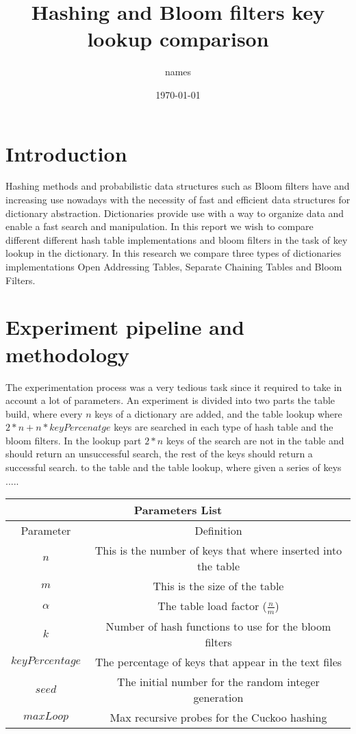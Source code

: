 \documentclass{article}
\title{Hashing and Bloom filters key lookup comparison}
\author{names}
\date{\today}
\begin{document}
    \maketitle
    \thispagestyle{empty}
    \begin{abstract}

    \end{abstract}


    \section{Introduction}
        Hashing methods and probabilistic data structures such as Bloom filters have and increasing use nowadays with the necessity of 
        fast and efficient data structures for dictionary abstraction. Dictionaries provide use with a way to organize data and enable 
        a fast search and manipulation. In this report we wish to compare different different hash table implementations and bloom filters 
        in the task of key lookup in the dictionary. In this research we compare three types of dictionaries implementations Open Addressing Tables, 
   	Separate Chaining Tables and Bloom Filters. 

    \section{Experiment pipeline and methodology}
    	The experimentation process was a very tedious task since it required to take in account a lot of parameters. An experiment is divided into two parts the table build, where every $n$ keys of a dictionary are added, and the table lookup where $2 * n + n * keyPercenatge$ keys are searched in each type of hash table and the bloom filters. In the lookup part $2 * n$ keys of the search are not in the table and should return an unsuccessful search, the rest of the keys should return a successful search. 
    	to the table and the table lookup, where given a series of keys 
    	.....
    	\begin{center}
	 \begin{tabular}{||c | c ||} 
	 \hline
	 \multicolumn{2}{|c|}{Parameters List} \\
	 \hline\hline 
	 Parameter & Definition \\
	\hline
	 $n$ & This is the number of keys that where inserted into the table \\
	 \hline
	 $m$ & This is the size of the table \\
	 \hline
	 $\alpha$ & The table load factor ($\frac{n}{m}$) \\
	 \hline
	 $k$ & Number of hash functions to use for the bloom filters \\
	 \hline
	 $keyPercentage$ & The percentage of keys that appear in the text files \\
	 \hline
	 $seed$ & The initial number for the random integer generation \\
	 \hline
	 $maxLoop$ & Max recursive probes for the Cuckoo hashing \\
	 \hline
	\end{tabular}
	\end{center}
\end{document}
